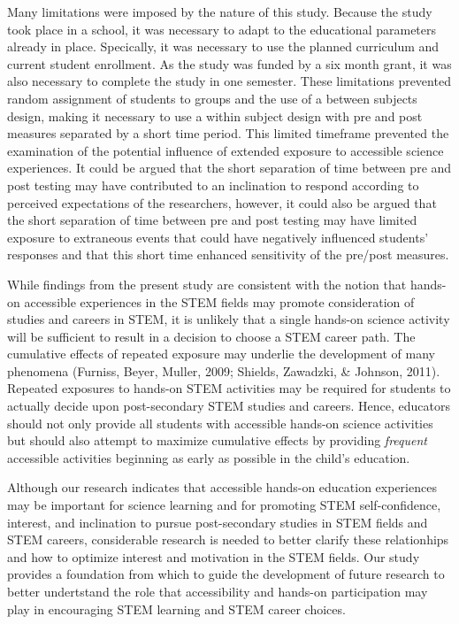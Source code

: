 \documentclass[11.5pt]{sig-alternate} %
\begin{document}
\begin{large}
Many limitations were imposed by the nature of this study. Because the study took place in a school, it was necessary to adapt to the educational parameters already in place. Specically, it was necessary to use the planned curriculum and current student enrollment. As the study was funded by a six month grant, it was also necessary to complete the study in one semester. These limitations prevented random assignment of students to groups and the use of a between subjects design, making it necessary to use a within subject design with pre and post measures separated by a short time period. This limited timeframe prevented the examination of the potential influence of extended exposure to accessible science experiences. It could be argued that the short separation of time between pre and post testing may have contributed to an inclination to respond according to perceived expectations of the researchers, however, it could also be argued that the short separation of time between pre and post testing may have limited exposure to extraneous events that could have negatively influenced students’ responses and that this short time enhanced sensitivity of the pre/post measures.

While findings from the present study are consistent with the notion that hands-on accessible experiences in the STEM fields may promote consideration of studies and careers in STEM, it is unlikely that a single hands-on science activity will be sufficient to result in a decision to choose a STEM career path. The cumulative effects of repeated exposure may underlie the development of many phenomena (Furniss, Beyer,  Muller,  2009; Shields, Zawadzki, \& Johnson, 2011). Repeated exposures to hands-on STEM activities may be required for students to actually decide upon post-secondary STEM studies and careers. Hence, educators should not only provide all students with accessible hands-on science activities but should also attempt to maximize cumulative effects by providing \textit{frequent} accessible activities beginning as early as possible in the child’s education.

Although our research indicates that accessible hands-on education experiences may be important for science learning and for promoting STEM self-confidence, interest, and inclination to pursue post-secondary studies in STEM fields and STEM careers, considerable research is needed to better clarify these relationhips and how to optimize interest and motivation in the STEM fields. Our study provides a foundation from which to guide the development of future research to better undertstand the role that accessibility and hands-on participation may play in encouraging STEM learning and STEM career choices.


\end{large}
\end{document}

